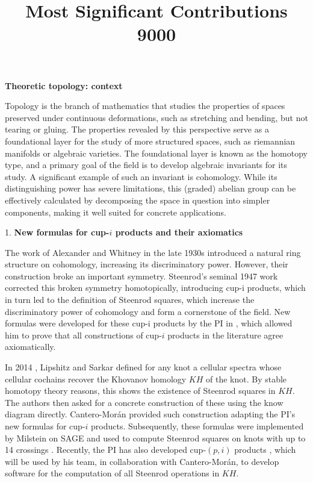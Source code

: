 \documentclass{amsart}
\title{Most Significant Contributions 9000}
\begin{document}
	\maketitle
	\textbf{Theoretic topology: context}

	Topology is the branch of mathematics that studies the properties of spaces preserved under continuous deformations, such as stretching and bending, but not tearing or gluing. The properties revealed by this perspective serve as a foundational layer for the study of more structured spaces, such as riemannian manifolds or algebraic varieties. The foundational layer is known as the homotopy type, and a primary goal of the field is to develop algebraic invariants for its study. A significant example of such an invariant is cohomology. While its distinguishing power has severe limitations, this (graded) abelian group can be effectively calculated by decomposing the space in question into simpler components, making it well suited for concrete applications.

	1. \textbf{New formulas for cup-$i$ products and their axiomatics}

	The work of Alexander and Whitney in the late 1930s introduced a natural ring structure on cohomology, increasing its discriminatory power. However, their construction broke an important symmetry. Steenrod's seminal 1947 work \cite{steenrod1947products} corrected this broken symmetry homotopically, introducing cup-i products, which in turn led to the definition of Steenrod squares, which increase the discriminatory power of cohomology and form a cornerstone of the field. New formulas were developed for these cup-i products by the PI in \cite{medina2023fast_sq}, which allowed him to prove that all constructions of cup-$i$ products in the literature agree axiomatically.

	In 2014 \cite{lipshitz2014khovanov}, Lipshitz and Sarkar defined for any knot a cellular spectra whose cellular cochains recover the Khovanov homology $KH$ of the knot. By stable homotopy theory reasons, this shows the existence of Steenrod squares in $KH$. The authors then asked for a concrete construction of these using the know diagram directly. Cantero-Mor\'an \cite{cantero-moran2020khovanov} provided such construction adapting the PI's new formulas for cup-$i$ products. Subsequently, these formulas were implemented by Milstein on SAGE and used to compute Steenrod squares on knots with up to 14 crossings \cite{milstein2022khovanov}.
	Recently, the PI has also developed cup-$(p,i)$ products \cite{medina2021may_st}, which will be used by his team, in collaboration with Cantero-Mor\'an, to develop software for the computation of all Steenrod operations in $KH$.
\end{document}
